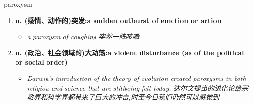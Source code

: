 
\begin{frame}
{\huge paroxysm}
\begin{center}
\begin{enumerate}\Large
  \item \textbf{n. (感情、动作的)突发:a sudden outburst of emotion or action}
  \begin{itemize}
    \item \em{\Large{a paroxysm of coughing 突然一阵咳嗽}}
  \end{itemize}
  \item \textbf{n. (政治、社会领域的)大动荡:a violent disturbance (as of the political or social order)}
  \begin{itemize}
    \item \em{\Large{Darwin's introduction of the theory of evolution created paroxysms in both religion and science that are stillbeing felt today. 达尔文提出的进化论给宗教界和科学界都带来了巨大的冲击,时至今日我们仍然可以感觉到}}
  \end{itemize}
\end{enumerate}
\end{center}
\end{frame}
